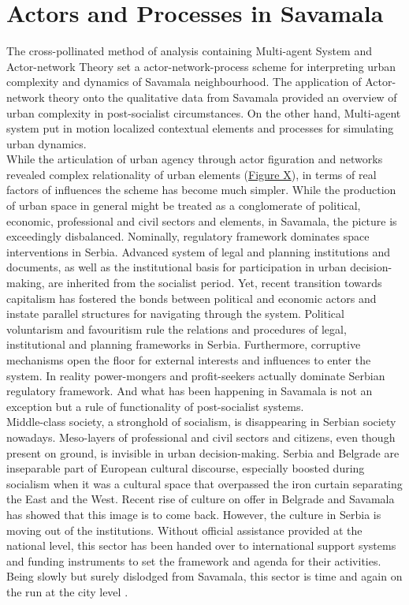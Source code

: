 \documentclass[11pt]{report}
\begin{document}
{\section{Actors and Processes in Savamala}

The cross-pollinated method of analysis containing Multi-agent System and Actor-network Theory set a actor-network-process scheme for interpreting urban complexity and dynamics of Savamala neighbourhood.
The application of Actor-network theory onto the qualitative data from Savamala provided an overview of urban complexity in post-socialist circumstances. On the other hand, Multi-agent system put in motion localized contextual elements and processes for simulating urban dynamics.
\\

While the articulation of urban agency through actor figuration and networks revealed complex relationality of urban elements (\href{ANT diagram}{Figure X}), in terms of real factors of influences the scheme has become much simpler.
While the production of urban space in general might be treated as a conglomerate of political, economic, professional and civil sectors and elements, in Savamala, the picture is exceedingly disbalanced.
Nominally, regulatory framework dominates space interventions in Serbia.
Advanced system of legal and planning institutions and documents, as well as the institutional basis for participation in urban decision-making, are inherited from the socialist period.
Yet, recent transition towards capitalism has fostered the bonds between political and economic actors and instate parallel structures for navigating through the system.
Political voluntarism and favouritism rule the relations and procedures of legal, institutional and planning frameworks in Serbia.
Furthermore, corruptive mechanisms open the floor for external interests and influences to enter the system.
In reality power-mongers and profit-seekers actually dominate Serbian regulatory framework. 
And what has been happening in Savamala is not an exception but a rule of functionality of post-socialist systems.
\\

Middle-class society, a stronghold of socialism, is disappearing in Serbian society nowadays. 
Meso-layers of professional and civil sectors and citizens, even though present on ground, is invisible in urban decision-making.
Serbia and Belgrade are inseparable part of European cultural discourse, especially boosted during socialism when it was a cultural space that overpassed the iron curtain separating the East and the West.
Recent rise of culture on offer in Belgrade and Savamala has showed that this image is to come back.
However, the culture in Serbia is moving out of the institutions.
Without official  assistance provided at the national level, this sector has been handed over to international support systems and funding instruments to set the framework and agenda for their activities. Being slowly but surely dislodged from Savamala, this sector is time and again on the run at the city level .
\\

}
\end{document}
